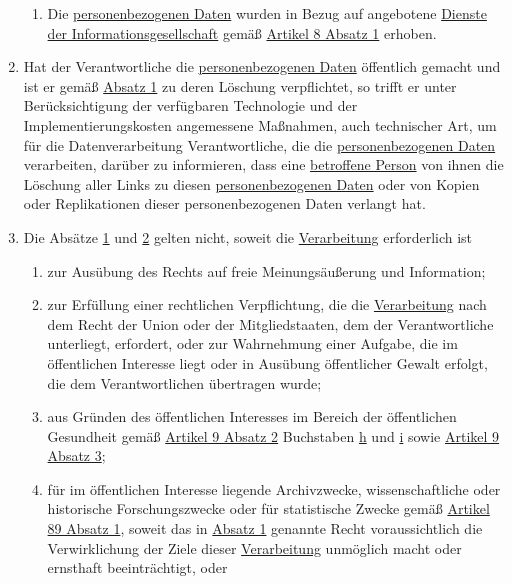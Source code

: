 \begin{enumerate}
\begin{enumerate}
    \item Die \hyperref[itm:04-1]{personenbezogenen Daten} wurden in Bezug auf angebotene \hyperref[itm:04-28]{Dienste der Informationsgesellschaft} gemäß
     \hyperref[itm:08-1]{Artikel 8 Absatz 1} erhoben.
    \label{itm:17-1f}

  \end{enumerate}

  \item Hat der Verantwortliche die \hyperref[itm:04-1]{personenbezogenen Daten} öffentlich gemacht und ist er gemäß \hyperref[itm:17-1]
   {Absatz 1} zu deren Löschung verpflichtet, so trifft er unter Berücksichtigung der verfügbaren Technologie und der
   Implementierungskosten angemessene Maßnahmen, auch technischer Art, um für die Datenverarbeitung Verantwortliche,
   die die \hyperref[itm:04-1]{personenbezogenen Daten} verarbeiten, darüber zu informieren, dass eine \hyperref[itm:04-1]{betroffene Person} von ihnen die
   Löschung aller Links zu diesen \hyperref[itm:04-1]{personenbezogenen Daten} oder von Kopien oder Replikationen dieser personenbezogenen
   Daten verlangt hat.
  \label{itm:17-2}

  \item Die Absätze \hyperref[itm:17-1]{1} und \hyperref[itm:17-2]{2} gelten nicht, soweit die \hyperref[itm:04-2]{Verarbeitung} erforderlich
   ist
  \label{itm:17-3}

  \begin{enumerate}
  
    \item zur Ausübung des Rechts auf freie Meinungsäußerung und Information;
    \label{itm:17-3a}

    \item zur Erfüllung einer rechtlichen Verpflichtung, die die \hyperref[itm:04-2]{Verarbeitung} nach dem Recht der Union oder der
     Mitgliedstaaten, dem der Verantwortliche unterliegt, erfordert, oder zur Wahrnehmung einer Aufgabe, die im
     öffentlichen Interesse liegt oder in Ausübung öffentlicher Gewalt erfolgt, die dem Verantwortlichen übertragen
     wurde;
    \label{itm:17-3b}

    \item aus Gründen des öffentlichen Interesses im Bereich der öffentlichen Gesundheit gemäß \hyperref[itm:09-2]
     {Artikel 9 Absatz 2} Buchstaben \hyperref[itm:09-2h]{h} und \hyperref[itm:09-2i]{i} sowie \hyperref[itm:09-3]
     {Artikel 9 Absatz 3};
    \label{itm:17-3c}

    \item für im öffentlichen Interesse liegende Archivzwecke, wissenschaftliche oder historische Forschungszwecke oder
     für statistische Zwecke gemäß \hyperref[itm:89-1]{Artikel 89 Absatz 1}, soweit das in \hyperref[itm:17-1]
     {Absatz 1} genannte Recht voraussichtlich die Verwirklichung der Ziele dieser \hyperref[itm:04-2]{Verarbeitung} unmöglich macht oder
     ernsthaft beeinträchtigt, oder
    \label{itm:17-3d}


\end{enumerate}
\end{enumerate}
